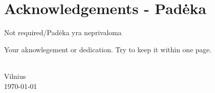 \chapter*{Acknowledgements - Padėka}
\label{cha:acknowledgements}



Not required/Padėka yra neprivaloma

Your aknowlegement or dedication. Try to keep it within one page.

{\flushright  
    \thesisAuthorName \ \thesisAuthorSurname \\ Vilnius\\ \today\\ 
}
